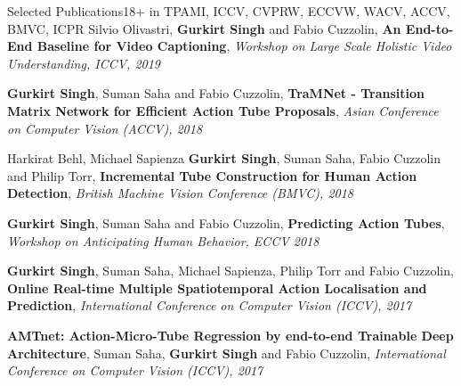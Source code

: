\documentclass{resume_long} %
\begin{document}
\begin{rSection}{Selected Publications}{18+\footnotesize{ in TPAMI, ICCV, CVPRW, ECCVW, WACV, ACCV, BMVC, ICPR}}
\vspace{-0.03in}
\small{Silvio Olivastri, \textbf{Gurkirt Singh} and Fabio Cuzzolin},
\textbf{An End-to-End Baseline for Video Captioning},
\textit{\small{Workshop on Large Scale Holistic Video Understanding, ICCV, 2019}}


\vspace{-0.03in}
\small{\textbf{Gurkirt Singh}, Suman Saha and Fabio Cuzzolin},
\textbf{TraMNet - Transition Matrix Network for Efficient Action Tube Proposals},
\textit{\small{Asian Conference on Computer Vision (ACCV), 2018}}


\vspace{0.03in}
\small{Harkirat Behl, Michael Sapienza \textbf{Gurkirt Singh}, Suman Saha, Fabio Cuzzolin and Philip Torr},
\textbf{Incremental Tube Construction for Human Action Detection},
\textit{\small{British Machine Vision Conference (BMVC), 2018}}


\vspace{-0.03in}
\small{\textbf{Gurkirt Singh}, Suman Saha and Fabio Cuzzolin},
\textbf{Predicting Action Tubes},
\textit{\small{Workshop on Anticipating Human Behavior, ECCV 2018}}


\vspace{-0.03in}
\small{\textbf{Gurkirt Singh}, Suman Saha, Michael Sapienza, Philip Torr and Fabio Cuzzolin},
\textbf{Online Real-time Multiple Spatiotemporal Action Localisation and Prediction},
\textit{\small{International Conference on Computer Vision (ICCV), 2017}}


\vspace{-0.03in}
\textbf{AMTnet: Action-Micro-Tube Regression by end-to-end Trainable Deep Architecture},
\small{Suman Saha, \textbf{Gurkirt Singh} and Fabio Cuzzolin},
\textit{\small{International Conference on Computer Vision (ICCV), 2017}}



\end{rSection}
\end{document}
